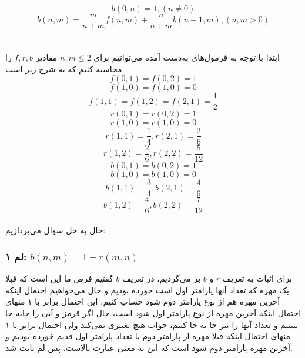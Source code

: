 \documentclass[12pt,a4paper]{article}
\begin{document}
$$b(0, n) = 1, (n \neq 0)$$
$$b(n, m) = \frac{m}{n+m} f(n, m) + \frac{n}{n+m} b(n-1, m), (n,m > 0)$$
\\
\\
ابتدا با توجه به فرمول‌های به‌دست آمده می‌توانیم برای $n,m \leq 2$ مقادیر $f, r, b$ را محاسبه کنیم که به شرح زیر است:
$$
f(0, 1) = f(0, 2) = 1
$$
$$
f(1, 0) = f(1, 0) = 0
$$
$$
f(1, 1) = f(1, 2) = f(2, 1) = \frac{1}{2}
$$
$$
r(0, 1) = r(0, 2) = 1
$$
$$
r(1, 0) = r(1, 0) = 0
$$
$$
r(1, 1) = \frac{1}{4}, r(2, 1) = \frac{2}{6}
$$
$$
r(1, 2) = \frac{2}{6}, r(2, 2) = \frac{5}{12}
$$
$$
b(0, 1) = b(0, 2) = 1
$$
$$
b(1, 0) = b(1, 0) = 0
$$
$$
b(1, 1) = \frac{3}{4}, b(2, 1) = \frac{4}{6}
$$
$$
b(1, 2) = \frac{4}{6}, b(2, 2) = \frac{7}{12}
$$
\\
حال به حل سوال می‌پردازیم:
\subsubsection*{لم ۱: 
$b(n, m) = 1 - r(m, n)$
}
برای اثبات به تعریف $r$ و $b$ بر می‌گردیم، در تعریف $b$ گفتیم فرض ما این است که قبلا یک مهره که تعداد آنها پارامتر اول است خورده بودیم و حال می‌خواهیم احتمال اینکه آخرین مهره هم از نوع پارامتر دوم شود حساب کنیم، این احتمال برابر با ۱ منهای احتمال اینکه آخرین مهره از نوع پارامتر اول شود است، حال اگر قرمز و آبی را جابه جا ببینیم و تعداد آنها را نیز جا به جا کنیم، جواب هیچ تغییری نمی‌کند ولی احتمال برابر با ۱ منهای احتمال اینکه قبلا مهره از پارامتر دوم با تعداد پارامتر اول قدیم خورده بودیم و آخرین مهره پارامتر دوم شود است که این به معنی عبارت بالاست. پس لم ثابت شد.
\\
\end{document}
